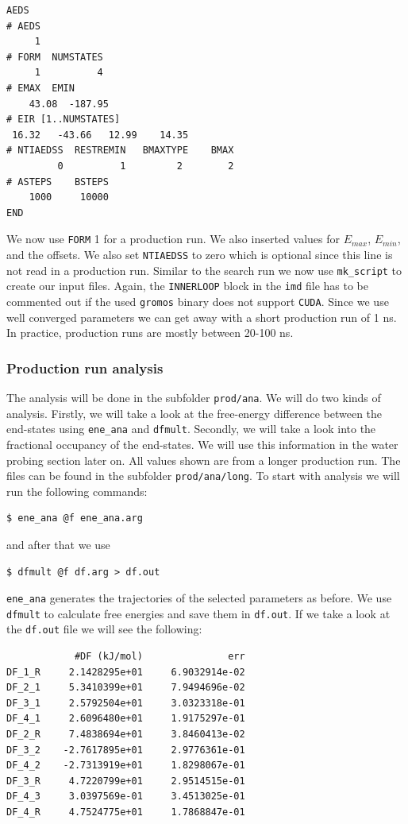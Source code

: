 \begin{lstlisting}
AEDS
# AEDS
     1
# FORM  NUMSTATES
     1          4
# EMAX  EMIN
    43.08  -187.95
# EIR [1..NUMSTATES]
 16.32   -43.66   12.99    14.35 
# NTIAEDSS  RESTREMIN   BMAXTYPE    BMAX   
         0          1         2        2      
# ASTEPS    BSTEPS
    1000     10000 
END
\end{lstlisting}

We now use \texttt{FORM} 1 for a production run. We also inserted values for $E_{max}$, $E_{min}$, and the offsets. We also set \texttt{NTIAEDSS} to zero which is optional since this line is not read in a production run. Similar to the search run we now use \texttt{mk\_script} to create our input files. Again, the \texttt{INNERLOOP} block in the \texttt{imd} file has to be commented out if the used \texttt{gromos} binary does not support \texttt{CUDA}.
Since we use well converged parameters we can get away with a short production run of 1 ns. In practice, production runs are mostly between 20-100 ns.

\subsubsection{Production run analysis}
The analysis will be done in the subfolder \texttt{prod/ana}. We will do two kinds of analysis. Firstly, we will take a look at the free-energy difference between the end-states using \texttt{ene\_ana} and \texttt{dfmult}. Secondly, we will take a look into the fractional occupancy of the end-states. We will use this information in the water probing section later on. All values shown are from a longer production run. The files can be found in the subfolder \texttt{prod/ana/long}. To start with analysis we will run the following commands:

\begin{lstlisting}
$ ene_ana @f ene_ana.arg
\end{lstlisting}

and after that we use

\begin{lstlisting}
$ dfmult @f df.arg > df.out
\end{lstlisting}

\texttt{ene\_ana} generates the trajectories of the selected parameters as before. We use \texttt{dfmult} to calculate free energies and save them in \texttt{df.out}. If we take a look at the \texttt{df.out} file we will see the following:

\begin{lstlisting}
            #DF (kJ/mol)               err
DF_1_R     2.1428295e+01     6.9032914e-02
DF_2_1     5.3410399e+01     7.9494696e-02
DF_3_1     2.5792504e+01     3.0323318e-01
DF_4_1     2.6096480e+01     1.9175297e-01
DF_2_R     7.4838694e+01     3.8460413e-02
DF_3_2    -2.7617895e+01     2.9776361e-01
DF_4_2    -2.7313919e+01     1.8298067e-01
DF_3_R     4.7220799e+01     2.9514515e-01
DF_4_3     3.0397569e-01     3.4513025e-01
DF_4_R     4.7524775e+01     1.7868847e-01
\end{lstlisting}

